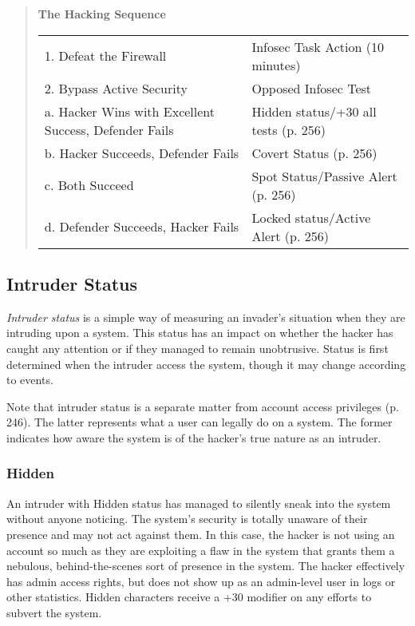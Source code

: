 \begin{quotation}
\textbf{The Hacking Sequence}

\begin{tabular}{ll}
1. Defeat the Firewall & Infosec Task Action (10 minutes) \\
2. Bypass Active Security & Opposed Infosec Test \\
\indent a. Hacker Wins with Excellent Success, Defender Fails & Hidden status/+30 all tests (p. 256) \\
\indent b. Hacker Succeeds, Defender Fails & Covert Status (p. 256) \\
\indent c. Both Succeed & Spot Status/Passive Alert (p. 256) \\
\indent d. Defender Succeeds, Hacker Fails & Locked status/Active Alert (p. 256) \\
\end{tabular}
\end{quotation}

\subsection{Intruder Status}

\textit{Intruder status} is a simple way of measuring an 
invader's situation when they are intruding upon 
a system. This status has an impact on whether the 
hacker has caught any attention or if they managed 
to remain unobtrusive. Status is first determined when 
the intruder access the system, though it may change 
according to events.

Note that intruder status is a separate matter from 
account access privileges (p. 246). The latter represents 
what a user can legally do on a system. The former 
indicates how aware the system is of the hacker's true 
nature as an intruder.

\subsubsection{Hidden}

An intruder with Hidden status has managed to silently
sneak into the system without anyone noticing. The
system's security is totally unaware of their presence 
and may not act against them. In this case, the hacker 
is not using an account so much as they are exploiting
a flaw in the system that grants them a nebulous,
behind-the-scenes sort of presence in the system. The 
hacker effectively has admin access rights, but does 
not show up as an admin-level user in logs or other 
statistics. Hidden characters receive a +30 modifier on 
any efforts to subvert the system.

